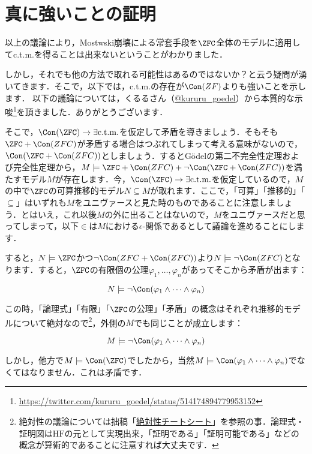 \documentclass[a4j]{ltjsarticle}
\begin{document}
\section{真に強いことの証明}
以上の議論により，Mostwski崩壊による常套手段を$\ZFC$全体のモデルに適用してc.t.m.を得ることは出来ないということがわかりました．

しかし，それでも他の方法で取れる可能性はあるのではないか？と云う疑問が湧いてきます．そこで，以下では，c.t.m.の存在が$\Con(ZF)$よりも強いことを示します．
以下の議論については，くるるさん（\href{https://twitter.com/kururu_goedel}{@kururu\_goedel}）から本質的な示唆\footnote{\url{https://twitter.com/kururu_goedel/status/514174894779953152}}を頂きました．ありがとうございます．

そこで，$\Con(\ZFC) \rightarrow \exists \text{c.t.m.}$を仮定して矛盾を導きましょう．そもそも$\ZFC + \Con(ZFC)$が矛盾する場合はつぶれてしまって考える意味がないので，$\Con(\ZFC + \Con(ZFC))$としましょう．するとG\"{o}delの第二不完全性定理および完全性定理から，$M \models \ZFC + \Con(ZFC) + \neg \Con(\ZFC + \Con(ZFC))$を満たすモデル$M$が存在します．今，$\Con(\ZFC) \rightarrow \exists \text{c.t.m.}$を仮定しているので，$M$の中で$\ZFC$の可算推移的モデル$N \subseteq M$が取れます．ここで，「可算」「推移的」「$\subseteq$」はいずれも$M$をユニヴァースと見た時のものであることに注意しましょう．とはいえ，これ以後$M$の外に出ることはないので，$M$をユニヴァースだと思ってしまって，以下$\in$は$M$における$\epsilon$-関係であるとして議論を進めることにします．

すると，$N \models \ZFC$かつ$\neg \Con(ZFC + \Con(ZFC))$より$N \models \neg \Con(ZFC)$となります．すると，$\ZFC$の有限個の公理$\varphi_1, \dots, \varphi_n$があってそこから矛盾が出ます：

\[
N \models \neg \Con(\varphi_1 \wedge \dots \wedge \varphi_n)
\]

この時，「論理式」「有限」「$\ZFC$の公理」「矛盾」の概念はそれぞれ推移的モデルについて絶対なので\footnote{絶対性の議論については拙稿「\href{https://konn-san.com/math/absoluteness-cheatsheet.html}{絶対性チートシート}」を参照の事．論理式・証明図は$\mathrm{HF}$の元として実現出来，「証明である」「証明可能である」などの概念が算術的であることに注意すれば大丈夫です．}，外側の$M$でも同じことが成立します：

\[
M \models \neg \Con(\varphi_1 \wedge \dots \wedge \varphi_n)
\]

しかし，他方で$M \models \Con(\ZFC)$でしたから，当然$M \models \Con(\varphi_1 \wedge \dots \wedge \varphi_n)$でなくてはなりません．これは矛盾です．

\nocite{Eda:2010}
\printbibliography[title=参考文献]
\end{document}
